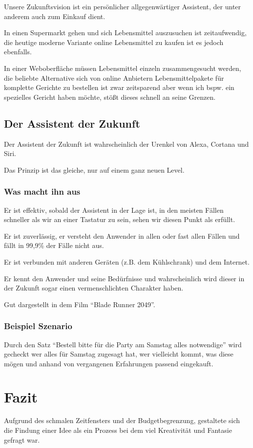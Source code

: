 \documentclass{sigchi}
\begin{document}
Unsere Zukunftsvision ist ein persönlicher allgegenwärtiger Assistent, der unter anderem auch zum Einkauf dient.

In einen Supermarkt gehen und sich Lebensmittel auszusuchen ist zeitaufwendig, die heutige moderne Variante online Lebensmittel zu kaufen ist es jedoch ebenfalls.

In einer Weboberfläche müssen Lebensmittel einzeln zusammengesucht werden, die beliebte Alternative sich von online Anbietern Lebensmittelpakete für komplette Gerichte zu bestellen ist zwar zeitsparend aber wenn ich bspw. ein spezielles Gericht haben möchte, stößt dieses schnell an seine Grenzen. 

\subsection{Der Assistent der Zukunft}
Der Assistent der Zukunft ist wahrscheinlich der Urenkel von Alexa, Cortana und Siri.

Das Prinzip ist das gleiche, nur auf einem ganz neuen Level.

\subsubsection{Was macht ihn aus}
Er ist effektiv, sobald der Assistent in der Lage ist, in den meisten Fällen schneller als wir an einer Tastatur zu sein, sehen wir diesen Punkt als erfüllt.

Er ist zuverlässig, er versteht den Anwender in allen oder fast allen Fällen und fällt in 99,9\% der Fälle nicht aus.

Er ist verbunden mit anderen Geräten (z.B. dem Kühlschrank) und dem Internet.

Er kennt den Anwender und seine Bedürfnisse und wahrscheinlich wird dieser in der Zukunft sogar einen vermenschlichten Charakter haben.

Gut dargestellt in dem Film “Blade Runner 2049”.

\subsubsection{Beispiel Szenario}
Durch den Satz “Bestell bitte für die Party am Samstag alles notwendige” wird gecheckt wer alles für Samstag zugesagt hat, wer vielleicht kommt, was diese mögen und anhand von vergangenen Erfahrungen passend eingekauft.

\section{Fazit}
Aufgrund des schmalen Zeitfensters und der Budgetbegrenzung, gestaltete sich die Findung einer Idee als ein Prozess bei dem viel Kreativität und Fantasie gefragt war.
\end{document}

